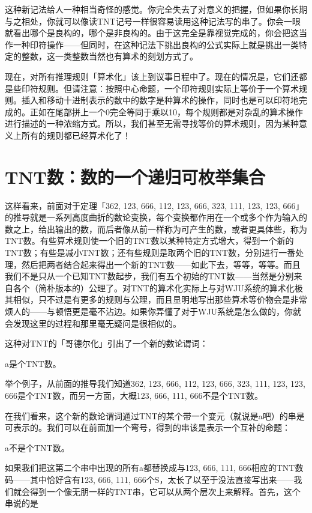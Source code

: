 \documentclass[
  12pt,
  twoside,
  openright,
  oldfontcommands,
]{memoir}
\begin{document}
这种新记法给人一种相当奇怪的感觉。你完全失去了对意义的把握，但如果你长期与之相处，你就可以像读TNT记号一样很容易读用这种记法写的串了。你会一眼就看出哪个是良构的，哪个是非良构的。由于这完全是靠视觉完成的，你会把这当作一种印符操作------但同时，在这种记法下挑出良构的公式实际上就是挑出一类特定的整数，这一类整数当然也有算术的刻划方式了。

现在，对所有推理规则「算术化」该上到议事日程中了。现在的情况是，它们还都是些印符规则。但请注意：按照中心命题，一个印符规则实际上等价于一个算术规则。插入和移动十进制表示的数中的数字是种算术的操作，同时也是可以印符地完成的。正如在尾部拼上一个0完全等同于乘以10，每个规则都是对杂乱的算术操作进行描述的一种浓缩方式。所以，我们甚至无需寻找等价的算术规则，因为某种意义上所有的规则都已经算术化了！

\section{TNT数：数的一个递归可枚举集合}

这样看来，前面对于定理「362, 123, 666, 112, 123, 666, 323, 111, 123,
123,
666」的推导就是一系列高度曲折的数论变换，每个变换都作用在一个或多个作为输入的数之上，给出输出的数，而后者像从前一样称为可产生的数，或者更具体些，称为TNT数。有些算术规则使一个旧的TNT数以某种特定方式增大，得到一个新的TNT数；有些是减小TNT数；还有些规则是取两个旧的TNT数，分别进行一番处理，然后把两者结合起来得出一个新的TNT数------如此下去，等等，等等。而且我们不是只从一个已知TNT数起步，我们有五个初始的TNT数------当然是分别来自各个（简朴版本的）公理了。对TNT的算术化实际上与对WJU系统的算术化极其相似，只不过是有更多的规则与公理，而且显明地写出那些算术等价物会是非常烦人的------与顿悟更是毫不沾边。如果你弄懂了对于WJU系统是怎么做的，你就会发现这里的过程和那里毫无疑问是很相似的。

这种对TNT的「哥德尔化」引出了一个新的数论谓词：

a是个TNT数。

举个例子，从前面的推导我们知道362, 123, 666, 112, 123, 666, 323, 111,
123, 123, 666是个TNT数，而另一方面，大概123, 666, 111, 666不是个TNT数。

在我们看来，这个新的数论谓词通过TNT的某个带一个变元（就说是a吧）的串是可表示的。我们可以在前面加一个弯号，得到的串该是表示一个互补的命题：

a不是个TNT数。

如果我们把这第二个串中出现的所有a都替换成与123, 666, 111,
666相应的TNT数码------其中恰好含有123, 666, 111,
666个S，太长了以至于没法直接写出来------我们就会得到一个像无朋一样的TNT串，它可以从两个层次上来解释。首先，这个串说的是
\end{document}
